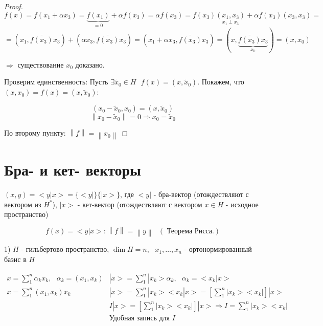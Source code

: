 \documentclass[12pt, a4paper]{report}
\begin{document}
\begin{proof}
    \[ f(x ) = f (x_1 + \alpha x_3 ) =\underbrace{ f(x_1 )}_{=0} + \alpha f(x_3 ) = \alpha f(x_3 ) = f(x_3 ) \underset{x_1 \perp x_3 }{(x_1 ,x_3 )} + \alpha f(x_3 ) (x_3 ,x_3 )  = \] 
    \[ = (x_1 , \overline{f(x_3 ) } x_3   ) + (\alpha x_3 , \overline{f(x_3 ) } x_3  ) = (x_1 + \alpha x_3 , \overline{f(x_3 )} x_3       ) = (x,\underbrace{ \overline{f(x_3 )} x_3}_{x_0}   ) = (x, x_0) \] 

    \( \Rightarrow \) существование \( x_0 \) доказано.

    Проверим единственность: Пусть \( \exists  \tilde{x } _0 \in  H \text{ }  f(x ) = (x, \tilde{ x }_ 0).  \) Покажем, что \( (x, x_0 ) = f(x ) = (x, \tilde{ x}_0) \): 

    \[ (x_0 - \tilde{x } _0 , x_0 ) = (x, \tilde{x } _0) \] 
    \[ \left\lVert x_0 - \tilde{ x  } _0  \right\rVert =0 \Rightarrow x_0 = \tilde{x }_0 \] 

    По второму пункту: \( \left\lVert f  \right\rVert = \left\lVert x_0 \right\rVert \) 

\end{proof}

\section{Бра- и кет- векторы }

\( (x, y ) = <y | x> = \{<y |\} \{| x>\} \), где \( <y| \) - бра-вектор (отождествляют с вектором из \( H^* \)), \( |x> \) - кет-вектор (отождествляют с вектором \( x \in  H \) - исходное пространство)

\[ f(x )  = <y|x > : \left\lVert  f  \right\rVert = \left\lVert y   \right\rVert \text{ }   (\text{ Теорема Рисса.} )\]  

1) \( H \) - гильбертово пространство, \( \dim H = n , \text{ }  x_1, \ldots, x_n \)  - ортонормированный базис в \( H \) 

\[ \begin{array}{l|l}
    \displaystyle x = \sum_{ 1} ^{n } \alpha_k x_k, \text{ }  \alpha_k = (x_1 , x_k)&\displaystyle  |x> = \sum_{1} ^{n }  |x_k > \alpha_k   , \text{ }  \alpha_k = <x_k | x>\\ 
    \displaystyle x= \sum_{1} ^{n }  (x_1 , x_k)x_k &\displaystyle  |x> = \sum_{1} ^{n }  |x_k > <x_k | x> = \left[ \sum_{1} ^{n }  |x_k > <x_k | \right] |x> \\[15pt] 
    & \displaystyle I |x> = \left[ \sum_{1}^n |x_k> <x_k |  \right] |x> \Rightarrow I = \sum_{1}^n |x_k> <x_k |\\
    &\text{Удобная запись для } I\\
\end{array} \] 
\end{document}
